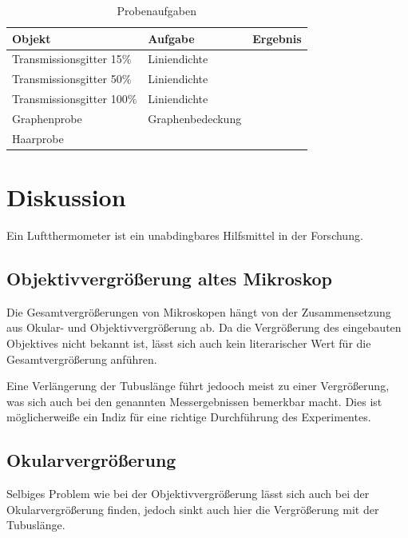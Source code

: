 \documentclass[12pt,a4paper,twoside]{article}
\begin{document}
\begin{table}[H]
    \centering
    \caption{Probenaufgaben}
    \label{tab:Probenaufgabe}
    \begin{tabular}{| l | l | l |}
        \hline
        Objekt & Aufgabe & Ergebnis \\
        \hline
        Transmissionsgitter 15$\%$ & Liniendichte &  \\
        Transmissionsgitter 50$\%$ & Liniendichte &  \\
        Transmissionsgitter 100$\%$ & Liniendichte &  \\
        Graphenprobe & Graphenbedeckung &  \\
        Haarprobe & & \\
        \hline
    \end{tabular}
\end{table}


\section{Diskussion} %

Ein Luftthermometer ist ein unabdingbares Hilfsmittel in der Forschung. 

\subsection{Objektivvergrößerung altes Mikroskop}

Die Gesamtvergrößerungen von Mikroskopen hängt von der Zusammensetzung aus Okular- und Objektivvergrößerung ab.
Da die Vergrößerung des eingebauten Objektives nicht bekannt ist, lässt sich auch kein literarischer Wert für die Gesamtvergrößerung anführen. \newline

\noindent
Eine Verlängerung der Tubuslänge führt jedooch meist zu einer Vergrößerung, was sich auch bei den genannten Messergebnissen bemerkbar macht. 
Dies ist möglicherweiße ein Indiz für eine richtige Durchführung des Experimentes. 

\subsection{Okularvergrößerung}

Selbiges Problem wie bei der Objektivvergrößerung lässt sich auch bei der Okularvergrößerung finden, jedoch sinkt auch hier die Vergrößerung mit der Tubuslänge. 
\end{document}
